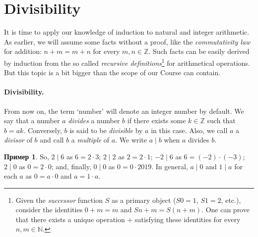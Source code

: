 \documentclass[12pt,notitlepage]{article}
\theoremstyle{plain}
\theoremstyle{definition}
\newtheorem{exm}[thm]{Пример}
\theoremstyle{plain}
\newcommand{\N}{\mathbb{N}}
\newcommand{\Z}{\mathbb{Z}}
\newcommand{\1}{\mathbf{1}}
\newcommand{\0}{\mathbf{0}}
\newcommand{\dvd}{\mathop{\mid}}
\newcommand{\mcomm}[1]{}
\begin{document}
\section{Divisibility}
\mcomm{This section opens a series of classical results on integer arithmetic. We looked upon them as a playground for the students to try induction principles in solving concrete problems  and, of course, to have some rest before coming back to more abstract concepts.}

It is time to apply our knowledge of induction to natural and integer arithmetic. As earlier, we will assume some facts without a proof, like the \emph{commutativity law} for addition: $n + m = m + n$ for every $m, n \in \Z$. Such facts can be easily derived by induction from the so called \emph{recursive definitions}\footnote{Given the \emph{successor} function $S$ as a primary object ($S 0 = 1$, $S 1 = 2$, etc.), consider the identities $0 + m = m$ and $S n + m = S(n + m)$. One can prove that there exists a unique operation ${+}$ satisfying these identities for every $n, m  \in \N$.} for arithmetical operations. But this topic is a bit bigger than the scope of our Course can contain.

\paragraph{Divisibility.} From now on, the term `number' will denote an integer number by default. We say that a number $a$ \emph{divides} a number $b$ if there exists some $k \in \Z$ such that $b = ak$. Conversely, $b$ is said to be \emph{divisible} by $a$ in this case. Also, we call $a$ a \emph{divisor} of $b$ and call $b$ a \emph{multiple} of $a$. We write $a \dvd b$ when $a$ divides $b$.

\mcomm{Most students feel quite uncomfortable with the fact that $0$ divides $0$. They tend to ignore the \emph{definition} in favor of \emph{connotations}: ``as it is not possible to \emph{divide by} zero, zero cannot \emph{divide} anything''. Of course, it is a general problem of mathematical education that the students just do not \emph{read} what is written.  The Instructor should use such examples to demonstrate the importance of clear and, perhaps, \emph{slow} reading in mathematics (likewise the latter is important in philology, according to Nietzsche's famous maxim).}
\begin{exm}
	So, $2 \dvd 6$ as $6 = 2 \cdot 3$; $2 \dvd 2$ as $2 = 2 \cdot 1$; $-2 \dvd 6$ as $6 = (-2) \cdot (-3)$; $2 \dvd 0$ as $0 = 2 \cdot 0$; and, finally, $0 \dvd 0$ as $0 = 0 \cdot 2019$. In general, $a \dvd 0$  and $1 \dvd a$ for each $a$ as $0 = a \cdot 0$ and $a = 1 \cdot a$.
\end{exm}
\end{document}
